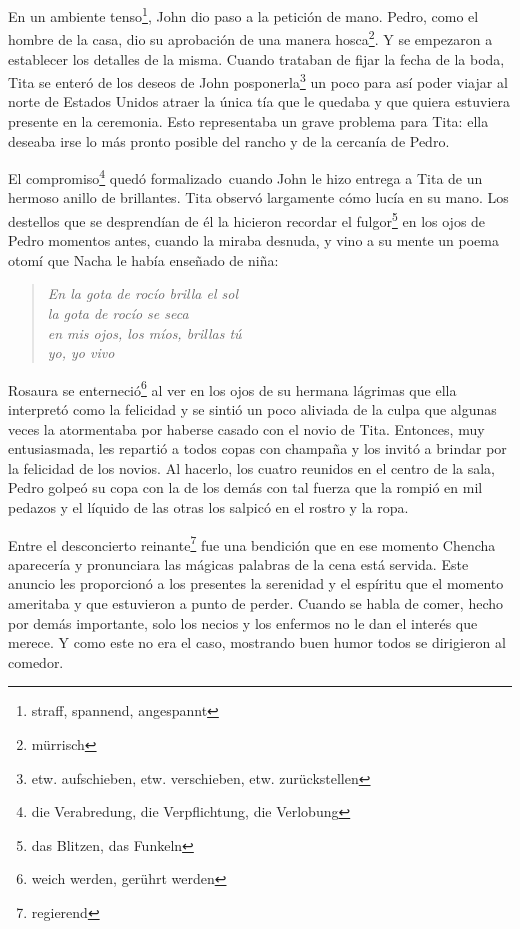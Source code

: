 En un ambiente tenso\footnote{straff, spannend, angespannt},
John dio paso a la petición de mano. Pedro, como
el hombre de la casa, dio su aprobación de una manera hosca\footnote{mürrisch}.
Y se empezaron a establecer los detalles de la misma. Cuando trataban de
fijar la fecha de la boda, Tita se enteró de los deseos de John posponerla\footnote{etw. aufschieben, etw. verschieben, etw. zurückstellen}
un poco para así poder viajar al norte de Estados Unidos
atraer la única tía que le quedaba y que quiera estuviera presente en la
ceremonia. Esto representaba un grave problema para Tita: ella deseaba
irse lo más pronto posible del rancho y de la cercanía de Pedro.

El compromiso\footnote{die Verabredung, die Verpflichtung, die Verlobung}
quedó formalizado~cuando John le hizo entrega a Tita
de un hermoso anillo de brillantes. Tita observó largamente cómo lucía
en su mano. Los destellos
que se desprendían de él la hicieron recordar el fulgor\footnote{das Blitzen, das Funkeln}
en los ojos de Pedro momentos antes, cuando la miraba desnuda,
y vino a su mente un poema otomí que Nacha le había enseñado de niña:

\begin{quote}
\itshape
En la gota de rocío brilla el sol \\
la gota de rocío se seca \\
en mis ojos, los míos, brillas tú \\
yo, yo vivo \ndots
\end{quote}

Rosaura se enterneció\footnote{weich werden, gerührt werden}
al ver en los ojos de su hermana lágrimas que
ella interpretó como la felicidad y se sintió un poco aliviada de la
culpa que algunas veces la atormentaba por haberse casado con el novio
de Tita. Entonces, muy entusiasmada, les repartió a todos copas con
champaña y los invitó a brindar por la felicidad de los novios. Al
hacerlo, los cuatro reunidos en el centro de la sala, Pedro golpeó su copa
con la de los demás con tal fuerza que la rompió en mil pedazos y el
líquido de las otras los salpicó en el rostro y la ropa.

Entre el desconcierto reinante\footnote{regierend} fue una bendición que en ese momento Chencha
aparecería y pronunciara las mágicas palabras de \glqq{}la cena está servida\grqq{}.
Este anuncio les proporcionó a los presentes la serenidad y el
espíritu que el momento ameritaba y que estuvieron a punto de perder.
Cuando se habla de comer, hecho por demás importante, solo los necios y
los enfermos no le dan el interés que merece. Y como este no era el
caso, mostrando buen humor todos se dirigieron al comedor.

